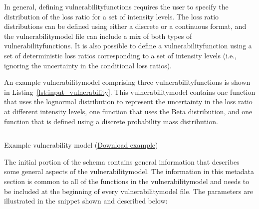 In general, defining \glspl{vulnerabilityfunction} requires the user to
specify the distribution of the loss ratio for a set of intensity levels. The
loss ratio distributions can be defined using either a discrete or a
continuous format, and the \gls{vulnerabilitymodel} file can include a mix of
both types of \glspl{vulnerabilityfunction}. It is also possible to define a
\gls{vulnerabilityfunction} using a set of deterministic loss ratios
corresponding to a set of intensity levels (i.e., ignoring the uncertainty in
the conditional loss ratios).

An example \gls{vulnerabilitymodel} comprising three
\glspl{vulnerabilityfunction} is shown in
Listing~\ref{lst:input_vulnerability}. This \gls{vulnerabilitymodel} contains
one function that uses the lognormal distribution to represent the uncertainty
in the loss ratio at different intensity levels, one function that uses the
Beta distribution, and one function that is defined using a discrete
probability mass distribution.

\begin{listing}[htbp]
  \inputminted[firstline=1,firstnumber=1,fontsize=\footnotesize,frame=single,linenos,bgcolor=lightgray]{xml}{oqum/risk/Verbatim/input_vulnerability.xml}
  \caption{Example vulnerability model (\href{https://raw.githubusercontent.com/GEMScienceTools/oq-engine-docs/master/oqum/risk/verbatim/input_vulnerability.xml}{Download example})}
  \label{lst:input_vulnerability}
\end{listing}


The initial portion of the schema contains general information that describes
some general aspects of the \gls{vulnerabilitymodel}. The information in this
metadata section is common to all of the functions in the
\gls{vulnerabilitymodel} and needs to be included at the beginning of every
\gls{vulnerabilitymodel} file. The parameters are illustrated in the snippet
shown and described below:

\inputminted[firstline=4,firstnumber=4,lastline=8,fontsize=\footnotesize,frame=single,linenos,bgcolor=lightgray]{xml}{oqum/risk/Verbatim/input_vulnerability.xml}

